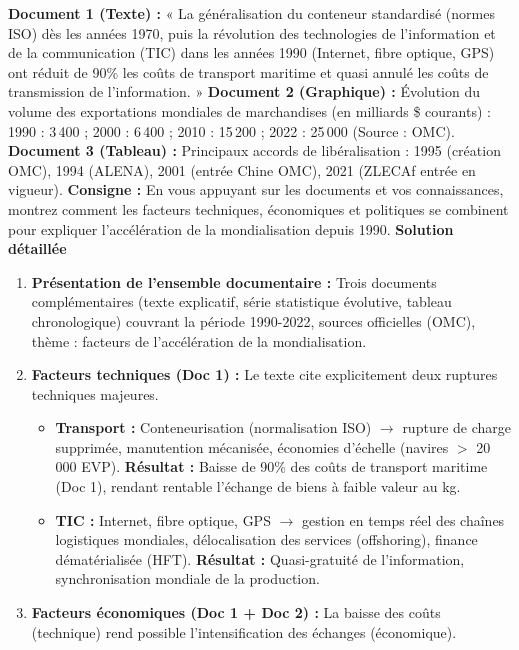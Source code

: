 \documentclass[11pt]{article}
\begin{document}
\begin{exoresolu}
    \textbf{Document 1 (Texte) :} « La généralisation du conteneur standardisé (normes ISO) dès les années 1970, puis la révolution des technologies de l'information et de la communication (TIC) dans les années 1990 (Internet, fibre optique, GPS) ont réduit de 90\% les coûts de transport maritime et quasi annulé les coûts de transmission de l'information. »
    \textbf{Document 2 (Graphique) :} Évolution du volume des exportations mondiales de marchandises (en milliards \$ courants) : 1990 : 3\,400 ; 2000 : 6\,400 ; 2010 : 15\,200 ; 2022 : 25\,000 (Source : OMC).
    \textbf{Document 3 (Tableau) :} Principaux accords de libéralisation : 1995 (création OMC), 1994 (ALENA), 2001 (entrée Chine OMC), 2021 (ZLECAf entrée en vigueur).
    \textbf{Consigne :} En vous appuyant sur les documents et vos connaissances, montrez comment les facteurs techniques, économiques et politiques se combinent pour expliquer l'accélération de la mondialisation depuis 1990.
    \tcblower
    \textbf{Solution détaillée}
    \begin{enumerate}
        \item \textbf{Présentation de l'ensemble documentaire :} Trois documents complémentaires (texte explicatif, série statistique évolutive, tableau chronologique) couvrant la période 1990-2022, sources officielles (OMC), thème : facteurs de l'accélération de la mondialisation.
        \item \textbf{Facteurs techniques (Doc 1) :} Le texte cite explicitement deux ruptures techniques majeures.
            \begin{itemize}
                \item \textbf{Transport :} Conteneurisation (normalisation ISO) $\rightarrow$ rupture de charge supprimée, manutention mécanisée, économies d'échelle (navires $>$ 20\,000 EVP). \textbf{Résultat :} Baisse de 90\% des coûts de transport maritime (Doc 1), rendant rentable l'échange de biens à faible valeur au kg.
                \item \textbf{TIC :} Internet, fibre optique, GPS $\rightarrow$ gestion en temps réel des chaînes logistiques mondiales, délocalisation des services (offshoring), finance dématérialisée (HFT). \textbf{Résultat :} Quasi-gratuité de l'information, synchronisation mondiale de la production.
            \end{itemize}
        \item \textbf{Facteurs économiques (Doc 1 + Doc 2) :} La baisse des coûts (technique) rend possible l'intensification des échanges (économique).

\end{enumerate}
\end{exoresolu}
\end{document}
